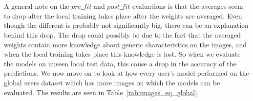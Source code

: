 \documentclass[12pt]{article}
\begin{document}
\\\\
A general note on the $pre\_fit$ and $post\_fit$ evaluations is that the averages seem to drop after the local training takes place after the weights are averaged. Even though the different is probably not significantly big, there can be an explanation behind this drop. The drop could possibly be due to the fact that the averaged weights contain more knowledge about generic characteristics on the images, and when the local training  takes place this knowledge is lost. So when we evaluate the models on unseen local test data, this cause a drop in the accuracy of the predictions. We now move on to look at how every user's model performed on the global users dataset which has more images on which the models can be evaluated. The results are seen in Table~\ref{tab:images_eq_global}.
\begin{table}[H]
\def\arraystretch{1.2}%

\caption{Image dataset: Results from testing user models on global user's data with $P = \frac{1}{8}$} \label{tab:images_eq_global}
\end{table}
\end{document}
